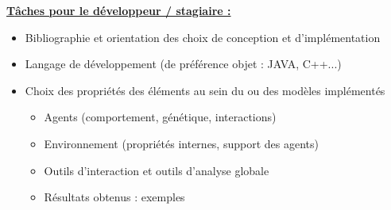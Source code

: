 \documentclass[11pt,twoside,a4paper]{article}
\begin{document}
\textbf{\underline{T{\^a}ches pour le d{\'e}veloppeur / stagiaire : }}
\begin{itemize}
	\item[ ] Bibliographie et orientation des choix de conception et d'impl{\'e}mentation
	\item[ ] Langage de d{\'e}veloppement (de pr{\'e}f{\'e}rence objet : JAVA, C++...)
	\item[ ] Choix des propri{\'e}t{\'e}s des {\'e}l{\'e}ments au sein du ou des mod{\`e}les impl{\'e}ment{\'e}s
	\begin{itemize}
		\item[ ] Agents (comportement, g{\'e}n{\'e}tique, interactions)
		\item[ ] Environnement (propri{\'e}t{\'e}s internes, support des agents)
		\item[ ] Outils d'interaction et outils d'analyse globale
		\item[ ] R{\'e}sultats obtenus : exemples
	\end{itemize}
\end{itemize}

\nocite{*}

\setcounter{page}{0}
\thispagestyle{empty}
\clearpage
\end{document}
